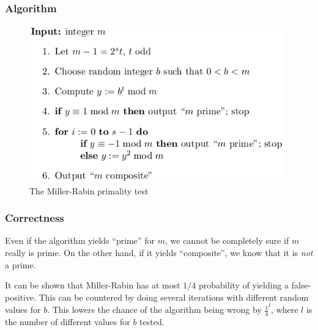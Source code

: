 \subsubsection*{Algorithm}
\begin{figure}[H]
  \begin{centering}
    \includegraphics[width=11cm]{images/7-miller-rabin}
    \caption{The Miller-Rabin primality test}
  \end{centering}
\end{figure}

\subsubsection*{Correctness}
Even if the algorithm yields ``prime'' for $m$, we cannot be
completely sure if $m$ really is prime. On the other hand, if it
yields ``composite'', we know that it is \emph{not} a prime.

It can be shown that Miller-Rabin has at most $1/4$ probability of
yielding a false-positive. This can be countered by doing several
iterations with different random values for $b$. This lowers the
chance of the algorithm being wrong by $\frac{1}{4}^l$, where $l$ is
the number of different values for $b$ tested.